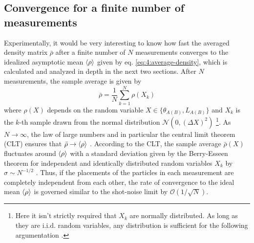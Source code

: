 \subsection*{Convergence for a finite number of measurements}
Experimentally, it would be very interesting to know how fast the averaged density matrix $\bar{\rho}$ after a finite number of $N$ measurements converges to the idealized asymptotic mean $\left\langle\rho\right\rangle$ given by eq. \eqref{eq:4:average-density}, which is calculated and analyzed in depth in the next two sections.
After $N$ measurements, the sample average is given by
\begin{equation}
  \bar{\rho} = \frac{1}{N} \sum_{k=1}^{N} \rho(X_k)
\end{equation}
where $\rho(X)$ depends on the random variable $X \in \{\theta_{A(B)}, L_{A(B)}\}$ and $X_k$ is the $k$-th sample drawn from the normal distribution $\mathcal{N}(0, (\Delta X)^2)$ \footnote{Here it isn't strictly required that $X_k$ are normally distributed. As long as they are i.i.d. random variables, any distribution is sufficient for the following argumentation \cite[p. 1195]{Riley_2018}.}.
As $N \rightarrow \infty$, the law of large numbers and in particular the central limit theorem (CLT) ensures that $\bar{\rho} \rightarrow \left\langle\rho\right\rangle$ \cite[p. 1195]{Riley_2018}.
According to the CLT, the sample average $\bar{\rho}(X)$ fluctuates around $\left\langle\rho\right\rangle$ with a standard deviation given by the Berry-Esseen theorem for independent and identically distributed random variables $X_k$ by $\sigma \sim N^{-1/2}$ \cite{Berry_1941}.
Thus, if the placements of the particles in each measurement are completely independent from each other, the rate of convergence to the ideal mean $\left\langle\rho\right\rangle$ is governed similar to the shot-noise limit by $\mathcal{O}(1/\sqrt{N})$.

